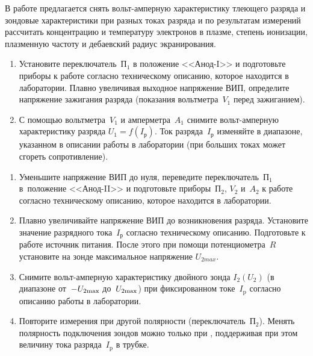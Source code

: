 \begin{lab:task}

В работе предлагается снять вольт-амперную характеристику тлеющего разряда и
зондовые характеристики при разных токах
разряда и по результатам измерений рассчитать концентрацию и температуру
электронов в плазме, степень ионизации,
плазменную частоту и дебаевский радиус экранирования.




\begin{enumerate}
\item Установите переключатель~$\text{П}_1$ в положение <<Анод-I>> и подготовьте
приборы к работе согласно техническому описанию, которое находится в
лаборатории. Плавно увеличивая выходное напряжение ВИП, определите напряжение
зажигания разряда (показания вольтметра~$V_{1}$ перед зажиганием).

\item С помощью вольтметра~$V_{1}$ и амперметра~$A_{1}$ снимите вольт-амперную
характеристику разряда $U_{1}=f(I_\text{р})$. Ток разряда~$I_\text{р}$ изменяйте
в диапазоне, указанном в описании работы в лаборатории (при больших токах может
сгореть сопротивление).

\end{enumerate}


\begin{enumerate}
\item Уменьшите напряжение ВИП до нуля, переведите переключатель~$\text{П}_1$
в~положение <<Анод-II>> и подготовьте приборы~$\text{П}_{2}$, $V_{2}$ и~$A_{2}$
к работе согласно техническому описанию, которое находится в лаборатории.

\item Плавно увеличивайте напряжение ВИП до возникновения разряда. Установите
значение разрядного тока~$I_\text{р}$ согласно техническому описанию.
Подготовьте к работе источник питания. После этого при помощи
потенциометра~$R$ установите на зонде максимальное напряжение $U_{2 max}$.

\item Снимите вольт-амперную характеристику двойного зонда $I_{2}(U_{2})$
(в диапазоне от~$-U_{2 \rm max}$ до~$U_{2 \rm max}$) при фиксированном токе~$I_\text{p}$
согласно описанию работы в лаборатории.

\item Повторите измерения при другой полярности (переключатель~$\text{П}_2$).
Менять полярность подключения зондов можно только при ,
поддерживая при этом величину тока разряда~$I_\text{p}$ в трубке.


\end{enumerate}
\end{lab:task}
